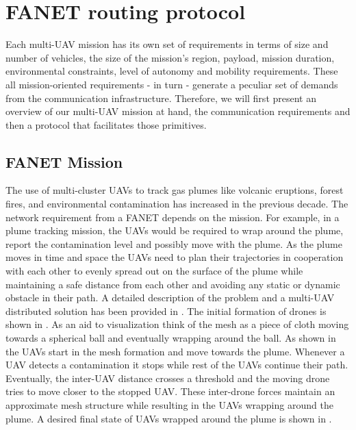 \chapter{FANET routing protocol}
Each multi-UAV mission has its own set of requirements in terms of size and number of vehicles, the size of the mission's region, payload, mission duration, environmental constraints, level of autonomy and mobility requirements. These all mission-oriented requirements - in turn - generate a peculiar set of demands from the communication infrastructure. Therefore, we will first present an overview of our multi-UAV mission at hand, the communication requirements and then a protocol that facilitates those primitives.

\section{FANET Mission}

The use of multi-cluster UAVs to track gas plumes like volcanic eruptions, forest fires, and environmental contamination has increased in the previous decade. The network requirement from a FANET depends on the mission. For example, in a plume tracking mission, the UAVs would be required to wrap around the plume, report the contamination level and possibly move with the plume. As the plume moves in time and space the UAVs need to plan their trajectories in cooperation with each other to evenly spread out on the surface of the plume while maintaining a safe distance from each other and avoiding any static or dynamic obstacle in their path. A detailed description of the problem and a multi-UAV distributed solution has been provided in \cite{8080382}. The initial formation of drones is shown in . As an aid to visualization think of the mesh as a piece of cloth moving towards a spherical ball and eventually wrapping around the ball. As shown in  the UAVs start in the mesh formation and move towards the plume. Whenever a UAV detects a contamination it stops while rest of the UAVs continue their path. Eventually, the inter-UAV distance crosses a threshold and the moving drone tries to move closer to the stopped UAV. These inter-drone forces maintain an approximate mesh structure while resulting in the UAVs wrapping around the plume. A desired final state of UAVs wrapped around the plume is shown in .  

